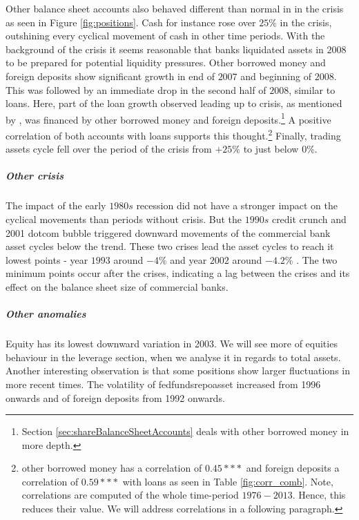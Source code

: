 \documentclass[12pt, a4paper]{article} %
\begin{document}
Other balance sheet accounts also behaved different than normal in in the crisis as seen in Figure \ref{fig:positions}.
Cash for instance rose over $25\%$ in the crisis, outshining every cyclical movement of cash in other time periods. With the background of the crisis it seems reasonable that banks liquidated assets in $2008$ to be prepared for potential liquidity pressures. 
Other borrowed money and foreign deposits show significant growth in end of $2007$ and beginning of $2008$. This was followed by an immediate drop in the second half of $2008$, similar to loans. Here, part of the loan growth observed leading up to crisis, as mentioned by \cite{bassett2008profits}, was financed by other borrowed money and foreign deposits.\footnote{Section \ref{sec:shareBalanceSheetAccounts} deals with other borrowed money in more depth.} A positive correlation of both accounts with loans supports this thought.\footnote{ other borrowed money has a correlation of $0.45***$ and foreign deposits a correlation of $0.59***$ with loans as seen in Table \ref{fig:corr_comb}. Note, correlations are computed of the whole time-period $1976-2013$. Hence, this reduces their value. We will address correlations in a following paragraph.} 
Finally, trading assets cycle fell over the period of the crisis from $+25\%$ to just below $0\%$.



\subparagraph{Other crisis}
The impact of the early $1980s$ recession did not have a stronger impact on the cyclical movements than periods without crisis. But the $1990s$ credit crunch and 2001 dotcom bubble triggered downward movements of the commercial bank asset cycles below the trend. These two crises lead the asset cycles to reach it lowest points - year $1993$ around $-4\%$ and year $2002$ around $-4.2\%$ . The two minimum points occur after the crises, indicating a lag between the crises and its effect on the balance sheet size of commercial banks.

\subparagraph{Other anomalies}
Equity has its lowest downward variation in 2003. We will see more of equities behaviour in the leverage section, when we analyse it in regards to total assets.
Another interesting observation is that some positions show larger fluctuations in more recent times. The volatility of fedfundsrepoasset increased from 1996 onwards and of foreign deposits from 1992 onwards.
\end{document}
